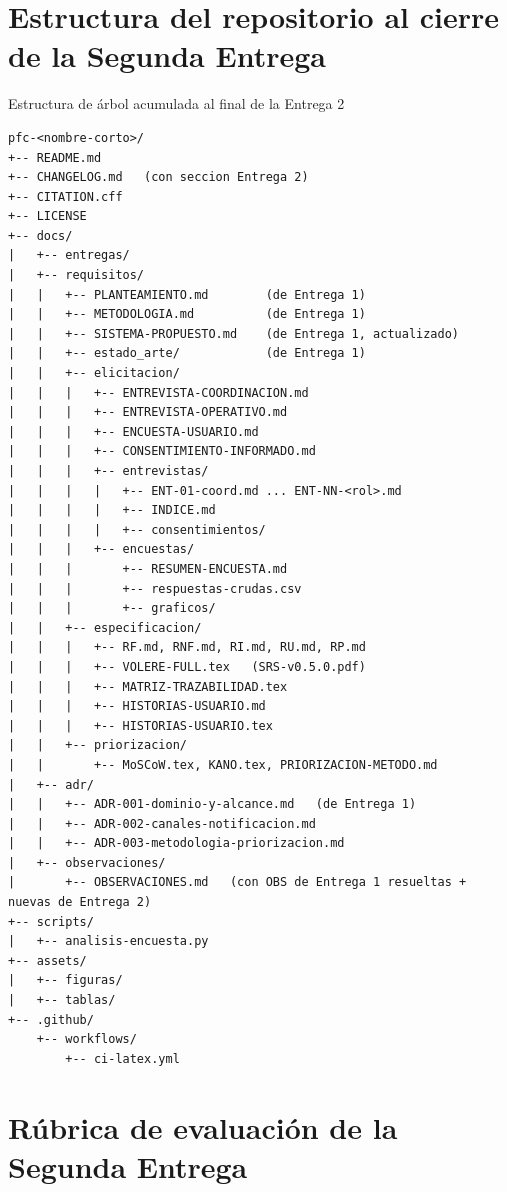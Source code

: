 \documentclass[11pt,a4paper]{article}
\begin{document}
\section{Estructura del repositorio al cierre de la Segunda Entrega}

\begin{cajarepo}{Estructura de \'arbol acumulada al final de la Entrega 2}
\begin{lstlisting}
pfc-<nombre-corto>/
+-- README.md
+-- CHANGELOG.md   (con seccion Entrega 2)
+-- CITATION.cff
+-- LICENSE
+-- docs/
|   +-- entregas/
|   +-- requisitos/
|   |   +-- PLANTEAMIENTO.md        (de Entrega 1)
|   |   +-- METODOLOGIA.md          (de Entrega 1)
|   |   +-- SISTEMA-PROPUESTO.md    (de Entrega 1, actualizado)
|   |   +-- estado_arte/            (de Entrega 1)
|   |   +-- elicitacion/
|   |   |   +-- ENTREVISTA-COORDINACION.md
|   |   |   +-- ENTREVISTA-OPERATIVO.md
|   |   |   +-- ENCUESTA-USUARIO.md
|   |   |   +-- CONSENTIMIENTO-INFORMADO.md
|   |   |   +-- entrevistas/
|   |   |   |   +-- ENT-01-coord.md ... ENT-NN-<rol>.md
|   |   |   |   +-- INDICE.md
|   |   |   |   +-- consentimientos/
|   |   |   +-- encuestas/
|   |   |       +-- RESUMEN-ENCUESTA.md
|   |   |       +-- respuestas-crudas.csv
|   |   |       +-- graficos/
|   |   +-- especificacion/
|   |   |   +-- RF.md, RNF.md, RI.md, RU.md, RP.md
|   |   |   +-- VOLERE-FULL.tex   (SRS-v0.5.0.pdf)
|   |   |   +-- MATRIZ-TRAZABILIDAD.tex
|   |   |   +-- HISTORIAS-USUARIO.md
|   |   |   +-- HISTORIAS-USUARIO.tex
|   |   +-- priorizacion/
|   |       +-- MoSCoW.tex, KANO.tex, PRIORIZACION-METODO.md
|   +-- adr/
|   |   +-- ADR-001-dominio-y-alcance.md   (de Entrega 1)
|   |   +-- ADR-002-canales-notificacion.md
|   |   +-- ADR-003-metodologia-priorizacion.md
|   +-- observaciones/
|       +-- OBSERVACIONES.md   (con OBS de Entrega 1 resueltas + nuevas de Entrega 2)
+-- scripts/
|   +-- analisis-encuesta.py
+-- assets/
|   +-- figuras/
|   +-- tablas/
+-- .github/
    +-- workflows/
        +-- ci-latex.yml
\end{lstlisting}
\end{cajarepo}

\section{R\'ubrica de evaluaci\'on de la Segunda Entrega}
\end{document}

